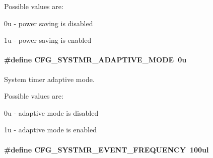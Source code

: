 Possible values are\-:
\begin{DoxyItemize}
\item 0u -\/ power saving is disabled
\item 1u -\/ power saving is enabled 
\end{DoxyItemize}\hypertarget{group__kern__cfg_ga5f07eea2a4be92cf0358f52eba6800c9}{
\paragraph[{C\-F\-G\-\_\-\-S\-Y\-S\-T\-M\-R\-\_\-\-A\-D\-A\-P\-T\-I\-V\-E\-\_\-\-M\-O\-D\-E}]{\setlength{\rightskip}{0pt plus 5cm}\#define C\-F\-G\-\_\-\-S\-Y\-S\-T\-M\-R\-\_\-\-A\-D\-A\-P\-T\-I\-V\-E\-\_\-\-M\-O\-D\-E~0u}}\label{group__kern__cfg_ga5f07eea2a4be92cf0358f52eba6800c9}


System timer adaptive mode. 

Possible values are\-:
\begin{DoxyItemize}
\item 0u -\/ adaptive mode is disabled
\item 1u -\/ adaptive mode is enabled 
\end{DoxyItemize}\hypertarget{group__kern__cfg_ga4e46164ae5a37bfc54c67b6f01d93eb1}{
\paragraph[{C\-F\-G\-\_\-\-S\-Y\-S\-T\-M\-R\-\_\-\-E\-V\-E\-N\-T\-\_\-\-F\-R\-E\-Q\-U\-E\-N\-C\-Y}]{\setlength{\rightskip}{0pt plus 5cm}\#define C\-F\-G\-\_\-\-S\-Y\-S\-T\-M\-R\-\_\-\-E\-V\-E\-N\-T\-\_\-\-F\-R\-E\-Q\-U\-E\-N\-C\-Y~100ul}}\label{group__kern__cfg_ga4e46164ae5a37bfc54c67b6f01d93eb1}


